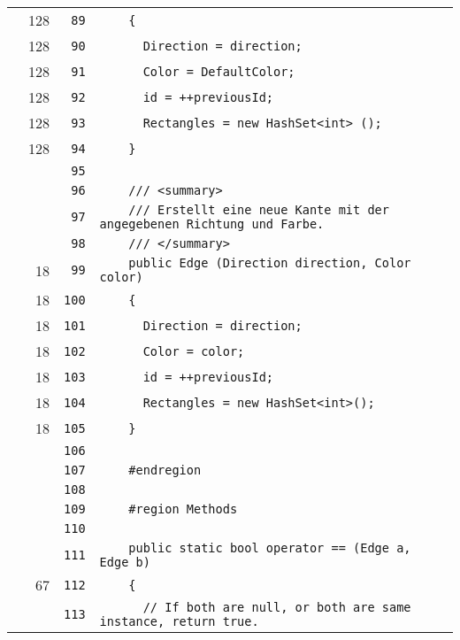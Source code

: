 \documentclass[a4paper,10pt]{article}
\begin{document}
\begin{longtable}[l]{lrrl}
\cellcolor{green} & 128 & \verb~89~ & \verb~    {~\\
\cellcolor{green} & 128 & \verb~90~ & \verb~      Direction = direction;~\\
\cellcolor{green} & 128 & \verb~91~ & \verb~      Color = DefaultColor;~\\
\cellcolor{green} & 128 & \verb~92~ & \verb~      id = ++previousId;~\\
\cellcolor{green} & 128 & \verb~93~ & \verb~      Rectangles = new HashSet<int> ();~\\
\cellcolor{green} & 128 & \verb~94~ & \verb~    }~\\
\cellcolor{gray} &  & \verb~95~ & \verb~~\\
\cellcolor{gray} &  & \verb~96~ & \verb~    /// <summary>~\\
\cellcolor{gray} &  & \verb~97~ & \verb~    /// Erstellt eine neue Kante mit der angegebenen Richtung und Farbe.~\\
\cellcolor{gray} &  & \verb~98~ & \verb~    /// </summary>~\\
\cellcolor{green} & 18 & \verb~99~ & \verb~    public Edge (Direction direction, Color color)~\\
\cellcolor{green} & 18 & \verb~100~ & \verb~    {~\\
\cellcolor{green} & 18 & \verb~101~ & \verb~      Direction = direction;~\\
\cellcolor{green} & 18 & \verb~102~ & \verb~      Color = color;~\\
\cellcolor{green} & 18 & \verb~103~ & \verb~      id = ++previousId;~\\
\cellcolor{green} & 18 & \verb~104~ & \verb~      Rectangles = new HashSet<int>();~\\
\cellcolor{green} & 18 & \verb~105~ & \verb~    }~\\
\cellcolor{gray} &  & \verb~106~ & \verb~~\\
\cellcolor{gray} &  & \verb~107~ & \verb~    #endregion~\\
\cellcolor{gray} &  & \verb~108~ & \verb~~\\
\cellcolor{gray} &  & \verb~109~ & \verb~    #region Methods~\\
\cellcolor{gray} &  & \verb~110~ & \verb~~\\
\cellcolor{gray} &  & \verb~111~ & \verb~    public static bool operator == (Edge a, Edge b)~\\
\cellcolor{green} & 67 & \verb~112~ & \verb~    {~\\
\cellcolor{gray} &  & \verb~113~ & \verb~      // If both are null, or both are same instance, return true.~\\

\end{longtable}
\end{document}

